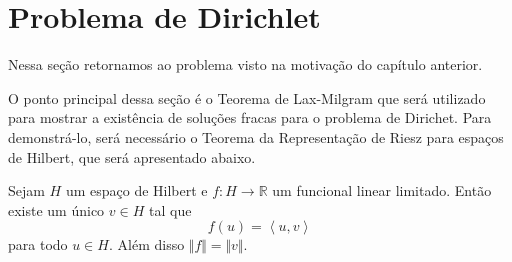 \documentclass[a4paper, 11pt]{book}
\theoremstyle{definition}
\newcommand{\bR}{\mathbb{R}}
\begin{document}
\section{Problema de Dirichlet} \label{sec:dirichlet}

Nessa seção retornamos ao problema visto na motivação do capítulo anterior.

O ponto principal dessa seção é o Teorema de Lax-Milgram que será utilizado para mostrar a existência de soluções fracas para o problema de Dirichet.
Para demonstrá-lo, será necessário o Teorema da Representação de Riesz para espaços de Hilbert, que será apresentado abaixo.

\begin{tbox}
    Sejam $H$ um espaço de Hilbert e $f : H \to \bR$ um funcional linear limitado.
    Então existe um único $v \in H$ tal que
    \[
        f(u) = \left\langle u, v\right\rangle
    \]
    para todo $u \in H$.
    Além disso $\Vert f \Vert = \Vert v \Vert$.
\end{tbox}
\end{document}
